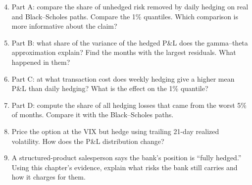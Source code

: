 \begin{enumerate}
  \setcounter{enumi}{3}
  \item Part A: compare the share of unhedged risk removed by daily hedging on real and Black--Scholes paths. Compare the 1\% quantiles. Which comparison is more informative about the claim?
  \item Part B: what share of the variance of the hedged P\&L does the gamma--theta approximation explain? Find the months with the largest residuals. What happened in them?
  \item Part C: at what transaction cost does weekly hedging give a higher mean P\&L than daily hedging? What is the effect on the 1\% quantile?
  \item Part D: compute the share of all hedging losses that came from the worst 5\% of months. Compare it with the Black--Scholes paths.
  \item Price the option at the VIX but hedge using trailing 21-day realized volatility. How does the P\&L distribution change?
  \item A structured-product salesperson says the bank's position is ``fully hedged.'' Using this chapter's evidence, explain what risks the bank still carries and how it charges for them.
\end{enumerate}
